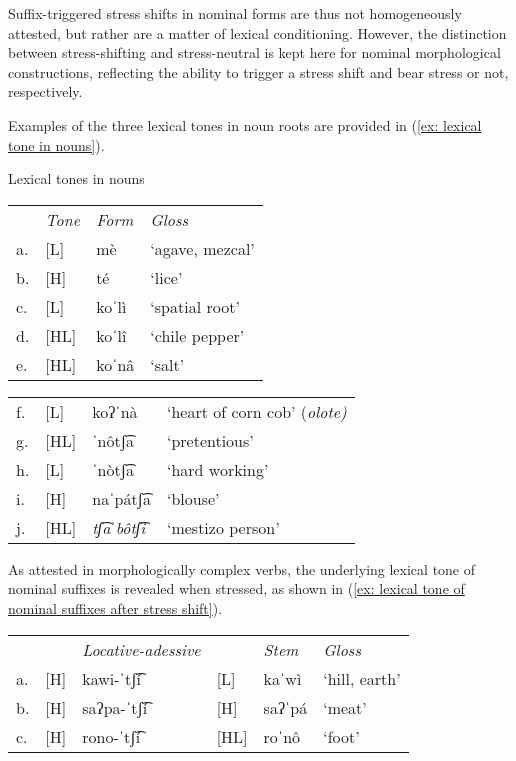 Suffix-triggered stress shifts in nominal forms are thus not homogeneously attested, but rather are a matter of lexical conditioning. However, the distinction between stress-shifting and stress-neutral is kept here for nominal morphological constructions, reflecting the ability to trigger a stress shift and bear stress or not, respectively.


Examples of the three lexical tones in noun roots are provided in (\ref{ex: lexical tone in nouns}).

\ea\label{ex: lexical tone in nouns}
{Lexical tones in nouns}

\begin{tabular}{llll}
       & \textit{Tone} & \textit{Form} & \textit{Gloss} \\
    a. & [L] & {{mè}}& {`agave, mezcal'}\\
    b. & {[H]} & {{té}} & {`lice'}\\
    c. & {[L]} & {{koˈlì}} & {`spatial root'}\\
    d. & {[HL]} & {{koˈlî}} & {‘chile pepper’}\\
    e. & {[HL]} & {{koˈnâ}} & {`salt'}\\
    \end{tabular}
\begin{tabular}{llll}
    f. & {[L]} & {{koʔˈnà}} & `heart of corn cob' (\textit{olote)}\\
    g. & {[HL]} & {{ˈnôtʃ͡a}} &  ‘pretentious'\\
    h. &  {[L]} & {{ˈnòtʃ͡}a}&  `hard working'\\
    i. &  {[H]} & {{naˈpátʃ͡a}}& `blouse'\\
    j. &  {[HL]} & \textit{{tʃ͡aˈbôtʃ͡i}}&  `mestizo person'\\
\end{tabular}
    \z

As attested in morphologically complex verbs, the underlying lexical tone of nominal suffixes is revealed when stressed, as shown in (\ref{ex: lexical tone of nominal suffixes after stress shift}).

\ea\label{ex: lexical tone of nominal suffixes after stress shift}

\begin{tabular}[t]{llllll}
       &  & \textit{Locative-adessive} &  & \textit{Stem} & \textit{Gloss} \\
    a. &  [H]  & kawi-ˈtʃ͡í &  [L] &  kaˈwì & `hill, earth'\\
    b. & [H]  & saʔpa-ˈtʃ͡í & [H]  & saʔˈpá & `meat'\\
    c. &  [H] & rono-ˈtʃ͡í & [HL] & roˈnô & `foot'\\
\end{tabular}

